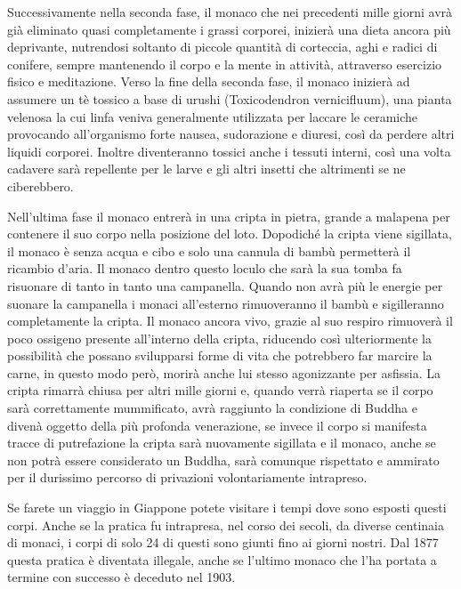 Successivamente nella seconda fase, il monaco che nei precedenti mille giorni avrà già eliminato quasi completamente i
grassi corporei, inizierà una dieta ancora più deprivante, nutrendosi soltanto di piccole quantità di corteccia, aghi e
radici di conifere, sempre mantenendo il corpo e la mente in attività, attraverso esercizio fisico e meditazione. Verso
la fine della seconda fase, il monaco inizierà ad assumere un tè tossico a base di urushi (Toxicodendron vernicifluum),
una pianta velenosa la cui linfa veniva generalmente utilizzata per laccare le ceramiche provocando all'organismo forte
nausea, sudorazione e diuresi, così da perdere altri liquidi corporei. Inoltre diventeranno tossici anche i tessuti
interni, così una volta cadavere sarà repellente per le larve e gli altri insetti che altrimenti se ne ciberebbero.

Nell'ultima fase il monaco entrerà in una cripta in pietra, grande a malapena per contenere il suo
corpo nella posizione del loto. Dopodiché la cripta viene sigillata, il monaco è senza acqua e cibo e solo una cannula
di bambù permetterà il ricambio d'aria. Il monaco dentro questo loculo che sarà la sua tomba fa risuonare di tanto in
tanto una campanella. Quando non avrà più le energie per suonare la campanella i monaci
all'esterno rimuoveranno il bambù e sigilleranno completamente la cripta. Il monaco ancora vivo,
grazie al suo respiro rimuoverà il poco ossigeno presente all'interno della cripta, riducendo così
ulteriormente la possibilità che possano svilupparsi forme di vita che potrebbero far marcire la carne, in questo modo
però, morirà anche lui stesso agonizzante per asfissia. La cripta rimarrà chiusa per altri mille giorni e, quando verrà
riaperta se il corpo sarà correttamente mummificato, avrà raggiunto la condizione di Buddha e divenà oggetto della più
profonda venerazione, se invece il corpo si manifesta tracce di putrefazione la cripta sarà nuovamente sigillata e il
monaco, anche se non potrà essere considerato un Buddha, sarà comunque rispettato e ammirato per il durissimo percorso
di privazioni volontariamente intrapreso. 

Se farete un viaggio in Giappone potete visitare i tempi dove sono esposti questi corpi. Anche se la pratica fu
intrapresa, nel corso dei secoli, da diverse centinaia di monaci, i corpi di solo 24 di questi sono giunti fino ai
giorni nostri. Dal 1877 questa pratica è diventata illegale, anche se l'ultimo monaco che l'ha
portata a termine con successo è deceduto nel 1903.


